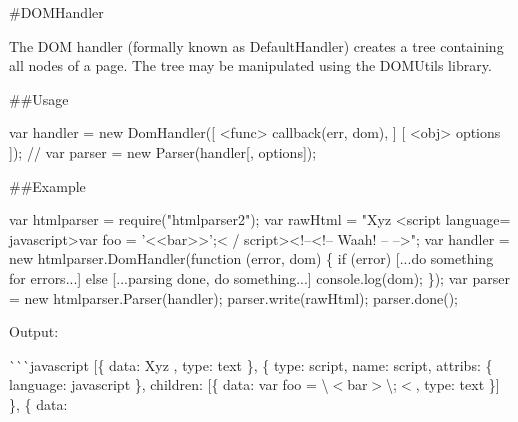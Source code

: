 \#\+D\+O\+M\+Handler \href{http://travis-ci.org/fb55/DomHandler}{\tt }

The D\+OM handler (formally known as Default\+Handler) creates a tree containing all nodes of a page. The tree may be manipulated using the D\+O\+M\+Utils library.

\#\#\+Usage 
\begin{DoxyCode}
var handler = new DomHandler([ <func> callback(err, dom), ] [ <obj> options ]);
// var parser = new Parser(handler[, options]);
\end{DoxyCode}


\#\#\+Example 
\begin{DoxyCode}
var htmlparser = require("htmlparser2");
var rawHtml = "Xyz <script language= javascript>var foo = '<<bar>>';< /  script><!--<!-- Waah! -- -->";
var handler = new htmlparser.DomHandler(function (error, dom) \{
    if (error)
      [...do something for errors...]
    else
      [...parsing done, do something...]
        console.log(dom);
\});
var parser = new htmlparser.Parser(handler);
parser.write(rawHtml);
parser.done();
\end{DoxyCode}


Output\+:

\`{}\`{}\`{}javascript \mbox{[}\{ data\+: \textquotesingle{}Xyz \textquotesingle{}, type\+: \textquotesingle{}text\textquotesingle{} \}, \{ type\+: \textquotesingle{}script\textquotesingle{}, name\+: \textquotesingle{}script\textquotesingle{}, attribs\+: \{ language\+: \textquotesingle{}javascript\textquotesingle{} \}, children\+: \mbox{[}\{ data\+: \textquotesingle{}var foo = \textbackslash{}\textquotesingle{}$<$bar$>$\textbackslash{}\textquotesingle{};$<$\textquotesingle{}, type\+: \textquotesingle{}text\textquotesingle{} \}\mbox{]} \}, \{ data\+: \textquotesingle{} 